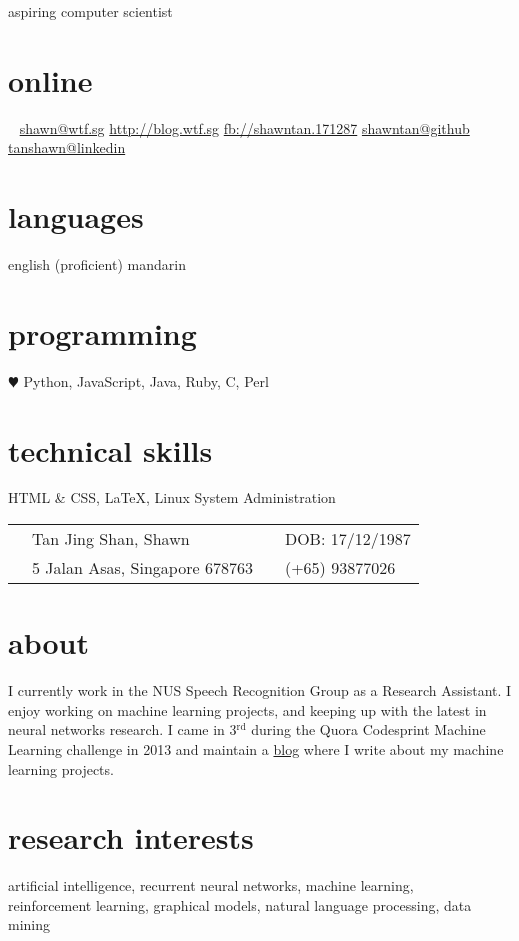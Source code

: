 \documentclass[]{friggeri-cv}
\begin{document}
{aspiring computer scientist

}

\begin{aside}
	\section{online}
	\Email~ \href{mailto:shawn@wtf.sg}{shawn@wtf.sg}
	\href{https://blog.wtf.sg}{http://blog.wtf.sg}
	\href{http://facebook.com/shawntan.171287}{fb://shawntan.171287}
	\href{http://github.com/shawntan}{shawntan@github}
	\href{http://sg.linkedin.com/in/tanshawn}{tanshawn@linkedin}
	\section{languages}
	english (proficient)
	mandarin
	\section{programming}
	{\color{red} $\varheartsuit$} Python, JavaScript, Java, Ruby, C, Perl
	\section{technical skills}
	HTML \& CSS, \LaTeX,
	Linux System Administration
\end{aside}
\begin{tabular}{ p{0.45cm} p{8cm} p{0.45cm} p{6.5cm} }
	\Male 	& Tan Jing Shan, Shawn	 & \Sagittarius &  DOB: 17/12/1987\\
	\Letter & 5 Jalan Asas, Singapore 678763 & \Mobilefone & (+65) 93877026 \\
\end{tabular}


\section{about}
I currently work in the NUS Speech Recognition Group as a Research Assistant. I 
enjoy working on machine learning projects, and keeping up with the latest in 
neural networks research. I came in 3$^\text{rd}$ during the Quora Codesprint 
Machine Learning challenge in 2013 and maintain a 
\href{http://blog.wtf.sg}{blog} where I write about my machine learning 
projects.


\section{research interests}
artificial intelligence, recurrent neural networks, machine learning,\\
reinforcement learning, graphical models, natural language processing, data 
mining
\end{document}
